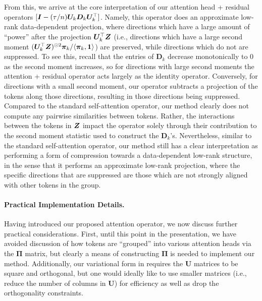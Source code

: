 \documentclass[../../book-main.tex]{subfiles}
\begin{document}
From this, we arrive at the core interpretation of our attention head + residual operators $[\bm{I} - (\tau/n)\bm U_{k}\bm D_{k}\bm U_{k}^{\top}]$.  Namely, this operator does an approximate low-rank data-dependent projection, where directions which have a large amount of ``power'' after the projection $\bm U_k^\top \bm{Z}$ (i.e., directions which have a large second moment $(\bm U_{k}^{\top}\bm{Z})^{\odot 2}\bm \pi_k / \langle \bm \pi_{k}, \bm 1\rangle$) are preserved, while directions which do not are suppressed. To see this, recall that the entries of $\bm D_k$ decrease monotonically to 0 as the second moment increases, so for directions with large second moments the attention + residual operator acts largely as the identity operator.  Conversely, for directions with a small second moment, our operator subtracts a projection of the tokens along those directions, resulting in those directions being suppressed. Compared to the standard self-attention operator, our method clearly does not compute any pairwise similarities between tokens. Rather, the interactions between the tokens in $\bm{Z}$ impact the operator solely through their contribution to the second moment statistic used to construct the $\bm D_{k}$'s.  Nevertheless, similar to the standard self-attention operator, our method still has a clear interpretation as performing a form of compression towards a data-dependent low-rank structure, in the sense that it performs an approximate low-rank projection, where the specific directions that are suppressed are those which are not strongly aligned with other tokens in the group.

\paragraph{Practical Implementation Details.} Having introduced our proposed attention operator, we now discuss further practical considerations.  First, until this point in the presentation, we have avoided discussion of how tokens are ``grouped'' into various attention heads via the $\bm\Pi$ matrix, but clearly a means of constructing $\bm\Pi$ is needed to implement our method.  Additionally, our variational form in  requires the $\bm U$ matrices to be square and orthogonal, but one would ideally like to use smaller matrices (i.e., reduce the number of columns in $\bm U$) for efficiency as well as drop the orthogonality constraints. 
\end{document}
